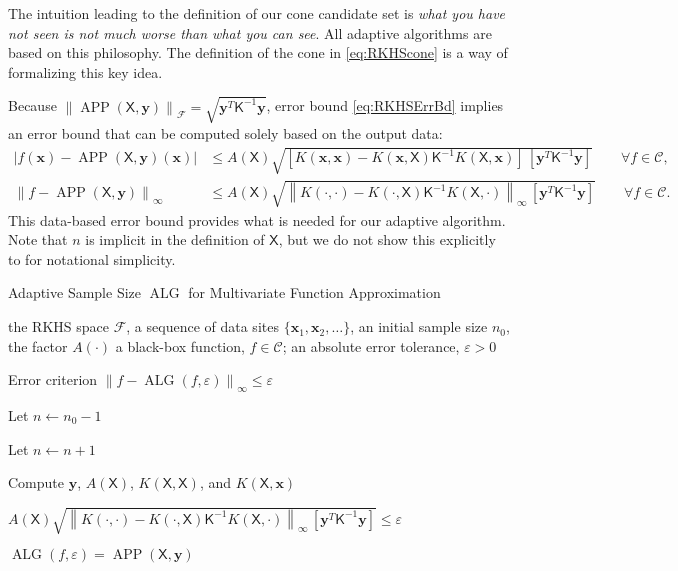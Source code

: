 \documentclass[11pt]{NSFamsart}
\DeclareMathOperator{\ALG}{ALG}
\DeclareMathOperator{\APP}{APP}
\newcommand{\mK}{\mathsf{K}}
\newcommand{\mX}{\mathsf{X}}
\newcommand{\bx}{{\boldsymbol{x}}}
\newcommand{\by}{{\boldsymbol{y}}}
\newcommand{\cc}{\mathcal{C}}
\newcommand{\calc}{{\mathcal{C}}}
\newcommand{\calf}{{\mathcal{F}}}
\def\abs#1{\ensuremath{\left \lvert #1 \right \rvert}}
\newcommand{\norm}[2][{}]{\ensuremath{\left \lVert #2 \right \rVert}_{#1}}
\newcommand{\bignorm}[2][{}]{\ensuremath{\bigl \lVert #2 \bigr \rVert}_{#1}}
\begin{document}
{The intuition leading to the definition of our cone candidate set is \emph{what you have not seen is not much worse than what you can see}. All adaptive algorithms are based on this philosophy. The definition of the cone in \eqref{eq:RKHScone} is a way of formalizing this key idea. 

Because $\bignorm[\calf]{\APP(\mX,\by)} = \sqrt{\by^T \mK^{-1} \by}$, error bound \eqref{eq:RKHSErrBd} implies an error bound that can be computed solely based on the output data: 
\begin{subequations} \label{eq:DataErrBd}
\begin{align}
    \abs{f(\bx) - \APP(\mX,\by)(\bx)} & \le   A(\mX) \sqrt{[K(\bx,\bx) - K(\bx,\mX) \mK^{-1} K(\mX,\bx) ] \, [\by^T \mK^{-1} \by] } \qquad \forall f \in \calc, \\
    \norm[\infty]{f - \APP(\mX,\by)} & \le   A(\mX) \sqrt{\norm[\infty]{K(\cdot,\cdot) - K(\cdot,\mX) \mK^{-1} K(\mX,\cdot)} \, [\by^T \mK^{-1} \by] } \qquad \forall f \in \calc.
\end{align}
\end{subequations}
This data-based error bound provides what is needed for our adaptive algorithm.  Note that $n$ is implicit in the definition of $\mX$, but we do not show this explicitly to for notational simplicity.

\begin{algorithm}[H]
\caption{Adaptive Sample Size $\ALG$ for Multivariate Function Approximation \label{alg:basicadapt}}
	\begin{algorithmic}
	\PARAM the RKHS space $\calf$, a sequence of data sites $\{\bx_1, \bx_2, \ldots \}$, an initial sample size $n_0$, the factor $A(\cdot)$
	\INPUT a black-box function, $f \in \cc$; an absolute error tolerance, $\varepsilon>0$

    \Ensure Error criterion $\norm[\infty]{f - \ALG(f,\varepsilon)} \le \varepsilon$

   \State Let $n \leftarrow n_0 -1$

\Repeat

\State Let $n \leftarrow n + 1$

\State Compute $\by$, $A(\mX)$, $K(\mX,\mX)$, and $K(\mX,\bx)$

\Until $A(\mX) \sqrt{\norm[\infty]{K(\cdot,\cdot) - K(\cdot,\mX) \mK^{-1} K(\mX,\cdot)} \, [\by^T \mK^{-1} \by] }  \le \varepsilon$

\RETURN $\ALG(f,\varepsilon) = \APP(\mX,\by)$

\end{algorithmic}
\end{algorithm}

}
\end{document}
